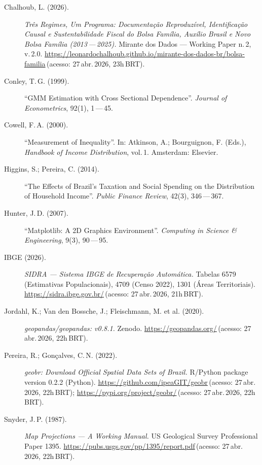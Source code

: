 \documentclass[12pt,a4paper,oneside]{article}
\newcommand{\xurl}[2]{\url{#1}\,(acesso: #2)}
\begin{document}
\begin{description}
\item[Chalhoub, L. (2026).]
\textit{Três Regimes, Um Programa: Documentação Reproduzível, Identificação
Causal e Sustentabilidade Fiscal do Bolsa Família, Auxílio Brasil e Novo
Bolsa Família (2013\,---\,2025).} Mirante dos Dados — Working Paper n.\,2,
v.\,2.0.
\xurl{https://leonardochalhoub.github.io/mirante-dos-dados-br/bolsa-familia}{27\,abr.\,2026, 23h\,BRT}.

\item[Conley, T.\,G. (1999).]
``GMM Estimation with Cross Sectional Dependence''.
\textit{Journal of Econometrics}, 92(1), 1\,---\,45.

\item[Cowell, F.\,A. (2000).]
``Measurement of Inequality''. In: Atkinson, A.; Bourguignon, F. (Eds.),
\textit{Handbook of Income Distribution}, vol.\,1.
Amsterdam: Elsevier.

\item[Higgins, S.; Pereira, C. (2014).]
``The Effects of Brazil's Taxation and Social Spending on the Distribution
of Household Income''.
\textit{Public Finance Review}, 42(3), 346\,---\,367.

\item[Hunter, J.\,D. (2007).]
``Matplotlib: A 2D Graphics Environment''.
\textit{Computing in Science \& Engineering}, 9(3), 90\,---\,95.

\item[IBGE (2026).]
\textit{SIDRA — Sistema IBGE de Recuperação Automática.}
Tabelas 6579 (Estimativas Populacionais), 4709 (Censo 2022),
1301 (Áreas Territoriais).
\xurl{https://sidra.ibge.gov.br/}{27\,abr.\,2026, 21h\,BRT}.

\item[Jordahl, K.; Van den Bossche, J.; Fleischmann, M. et al. (2020).]
\textit{geopandas/geopandas: v0.8.1.} Zenodo.
\xurl{https://geopandas.org/}{27\,abr.\,2026, 22h\,BRT}.

\item[Pereira, R.; Gonçalves, C.\,N. (2022).]
\textit{geobr: Download Official Spatial Data Sets of Brazil.}
R/Python package version 0.2.2 (Python).
\xurl{https://github.com/ipeaGIT/geobr}{27\,abr.\,2026, 22h\,BRT};
\xurl{https://pypi.org/project/geobr/}{27\,abr.\,2026, 22h\,BRT}.

\item[Snyder, J.\,P. (1987).]
\textit{Map Projections — A Working Manual.}
US Geological Survey Professional Paper 1395.
\xurl{https://pubs.usgs.gov/pp/1395/report.pdf}{27\,abr.\,2026, 22h\,BRT}.


\end{description}
\end{document}
